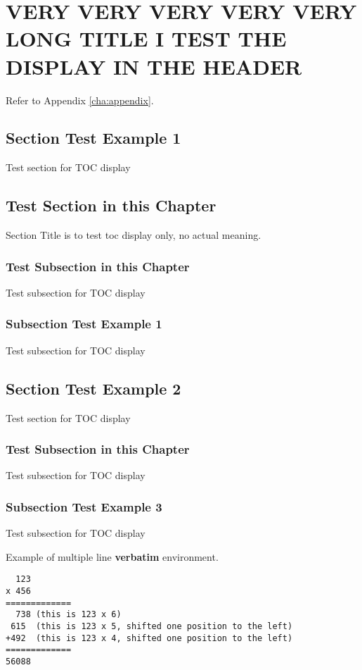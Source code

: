 \chapter{VERY VERY VERY VERY VERY LONG TITLE I TEST THE DISPLAY IN THE HEADER}

Refer to Appendix \ref{cha:appendix}.

\section{Section Test Example 1 }


Test section for TOC display

\section{Test Section in this Chapter}

Section Title is to test toc display only, no actual meaning.

\subsection{Test Subsection in this Chapter}
Test subsection for TOC display

\subsection{Subsection Test Example 1}

Test subsection for TOC display

\section{Section Test Example 2}

Test section for TOC display

\subsection{Test Subsection in this Chapter}

Test subsection for TOC display

\subsection{Subsection Test Example 3 }
Test subsection for TOC display

Example of multiple line \textbf{verbatim} environment.

\begin{lstlisting}
  123
x 456
=============
  738 (this is 123 x 6)
 615  (this is 123 x 5, shifted one position to the left)
+492  (this is 123 x 4, shifted one position to the left)
=============
56088
\end{lstlisting}



